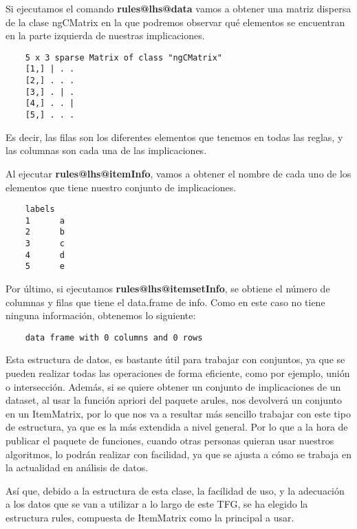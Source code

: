 Si ejecutamos el comando \textbf{rules@lhs@data} vamos a obtener una matriz dispersa de la clase 
ngCMatrix en la que podremos observar qu\'e elementos se encuentran en la parte izquierda de 
nuestras implicaciones.

\begin{verbatim}
    5 x 3 sparse Matrix of class "ngCMatrix"
    [1,] | . .
    [2,] . . .
    [3,] . | .
    [4,] . . |
    [5,] . . .
\end{verbatim}

Es decir, las filas son los diferentes elementos que tenemos en todas las reglas, y las 
columnas son cada una de las implicaciones.


Al ejecutar \textbf{rules@lhs@itemInfo}, vamos a obtener el nombre de cada uno de los elementos que 
tiene nuestro conjunto de implicaciones. 

\begin{verbatim}
    labels
    1      a
    2      b
    3      c
    4      d
    5      e
\end{verbatim}


Por \'ultimo, si ejecutamos \textbf{rules@lhs@itemsetInfo}, se obtiene el n\'umero de columnas y filas 
que tiene el data.frame de info. 
Como en este caso no tiene ninguna informaci\'on, obtenemos lo siguiente:
\begin{verbatim}
    data frame with 0 columns and 0 rows
\end{verbatim}


Esta estructura de datos, es bastante \'util para trabajar con conjuntos, ya que se pueden 
realizar todas las operaciones de forma eficiente, como por ejemplo, uni\'on o intersecci\'on.
Adem\'as, si se quiere obtener un conjunto de implicaciones de un dataset, al usar la funci\'on 
apriori del paquete arules, nos devolver\'a un conjunto en un ItemMatrix, por lo que nos va a 
resultar m\'as sencillo trabajar con este tipo de estructura, ya que es la m\'as 
extendida a nivel general. Por lo que a la hora de publicar el paquete de funciones, cuando otras 
personas quieran usar nuestros algoritmos, lo podr\'an realizar con facilidad, ya que se ajusta 
a c\'omo se trabaja en la actualidad en an\'alisis de datos.

As\'i que, debido a la estructura de esta clase, la facilidad de uso, y la adecuaci\'on a 
los datos que se van a utilizar a lo largo de este TFG, se ha elegido la estructura rules, compuesta de ItemMatrix 
como la principal a usar.

